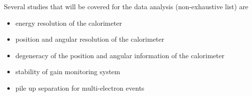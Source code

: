 Several studies that will be covered for the data analysis (non-exhaustive list) are
\begin{itemize}
\item energy resolution of the calorimeter
\item position and angular resolution of the calorimeter
\item degeneracy of the position and angular information of the calorimeter
\item stability of gain monitoring system
\item pile up separation for multi-electron events
\end{itemize}


